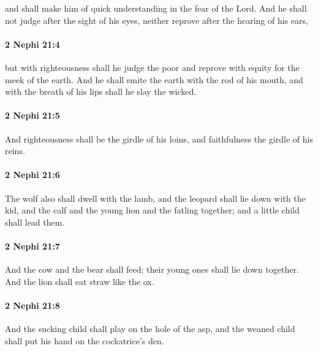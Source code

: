 			and shall make him of quick understanding in the fear of the Lord.
			And he shall not judge after the sight of his eyes,
			neither reprove after the hearing of his ears,

		\paragraph{2 Nephi 21:4} %
			\label{2NEPHI-21-4}

			but with righteousness shall he judge the poor
			and reprove with equity for the meek of the earth.
			And he shall smite the earth with the rod of his mouth,
			and with the breath of his lips shall he slay the wicked.

		\paragraph{2 Nephi 21:5} %
			\label{2NEPHI-21-5}

			And righteousness shall be the girdle of his loins,
			and faithfulness the girdle of his reins.

		\paragraph{2 Nephi 21:6} %
			\label{2NEPHI-21-6}

			The wolf also shall dwell with the lamb,
			and the leopard shall lie down with the kid,
			and the calf and the young lion and the fatling together;
			and a little child shall lead them.

		\paragraph{2 Nephi 21:7} %
			\label{2NEPHI-21-7}

			And the cow and the bear shall feed;
			their young ones shall lie down together.
			And the lion shall eat straw like the ox.

		\paragraph{2 Nephi 21:8} %
			\label{2NEPHI-21-8}

			And the sucking child shall play on the hole of the asp,
			and the weaned child shall put his hand on the cockatrice's den.

